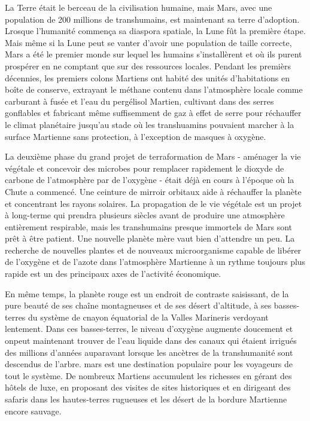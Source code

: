                                                             La Terre était le berceau de la civilisation humaine, mais Mars, avec une population de 200 millions de transhumains, est maintenant sa terre d'adoption. Lrosque l'humanité commença sa diaspora spatiale, la Lune fût la première étape. Mais même si la Lune peut se vanter d'avoir une population de taille correcte, Mars a été le premier monde sur lequel les humains s'installèrent et où ils purent prospérer en ne comptant que sur des ressources locales. Pendant les premièrs décennies, les premiers colons Martiens ont habité des unités d'habitations en boîte de conserve, extrayant le méthane contenu dans l'atmosphère locale comme carburant à fusée et l'eau du pergélisol Martien, cultivant dans des serres gonflables et fabricant même suffisemment de gaz à effet de serre pour réchauffer le climat planétaire jusqu'au stade où les transhuamins pouvaient marcher à la surface Martienne sans protection, à l'exception de masques à oxygène. 

                                                            La deuxième phase du grand projet de terraformation de Mars - aménager la vie végétale et concevoir des microbes pour remplacer rapidement le dioxyde de carbone de l'atmosphère par de l'oxygène - était déjà en cours à l'époque où la Chute a commencé. Une ceinture de mirroir orbitaux aide à réchauffer la planète et concentrant les rayons solaires. La propagation de le vie végétale est un projet à long-terme qui prendra plusieurs siècles avant de produire une atmosphère entièrement respirable, mais les transhumains presque immortels de Mars sont prêt à être patient. Une nouvelle planète mère vaut bien d'attendre un peu. La recherche de nouvelles plantes et de nouveaux microorganisme capable de libérer de l'oxygène et de l'azote dans l'atmosphère Martienne à un rythme toujours plus rapide est un des principaux axes de l'activité économique. 

                                                            En même temps, la planète rouge est un endroit de contraste saisissant, de la pure beauté de ses chaîne montagneuses et de ses désert d'altitude, à ses basses-terres du système de cnayon équatorial de la Valles Marineris verdoyant lentement. Dans ces basses-terres, le niveau d'oxygène augmente doucement et onpeut maintenant trouver de l'eau liquide dans des canaux qui étaient irrigués des millions d'années auparavant lorsque les ancètres de la transhumanité sont descendus de l'arbre. mars est une destination populaire pour les voyageurs de tout le système. De nombreux Martiens accumulent les richesses en gérant des hôtels de luxe, en proposant des visites de sites historiques et en dirigeant des safaris dans les hautes-terres rugueuses et les désert de la bordure Martienne encore sauvage. 


